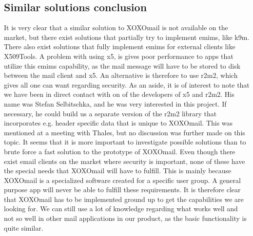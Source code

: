 \subsection{Similar solutions conclusion}
It is very clear that a similar solution to XOXOmail is not available on the market, but there exist solutions that partially try to implement \gls{emims}, like \gls{k9m}. There also exist solutions that fully implement \gls{emims} for external clients like X509Tools. A problem with using \gls{x5}, is gives poor performance to apps that utilize this \gls{emims} capability, as the mail message will have to be stored to disk between the mail client and \gls{x5}. An alternative is therefore to use \gls{r2m2}, which gives all one can want regarding security.
\newline
\newline
As an aside, it is of interest to note that we have been in direct contact with on of the developers of \gls{x5} and \gls{r2m2}. His name was Stefan Selbitschka, and he was very interested in this project. If necessary, he could build us a separate version of the \gls{r2m2} library that incorporates e.g. header specific data that is unique to XOXOmail. This was mentioned at a meeting with Thales, but no discussion was further made on this topic. It seems that it is more important to investigate possible solutions than to brute force a fast solution to the prototype of XOXOmail.
\newline
\newline
Even though there exist email clients on the market where security is important, none of these have the special needs that XOXOmail will have to fulfill. This is mainly because XOXOmail is a specialized software created for a specific user group. A general purpose app will never be able to fulfill these requirements. It is therefore clear that XOXOmail has to be implemented ground up to get the capabilities we are looking for. We can still use a lot of knowledge regarding what works well and not so well in other mail applications in our product, as the basic functionality is quite similar.

